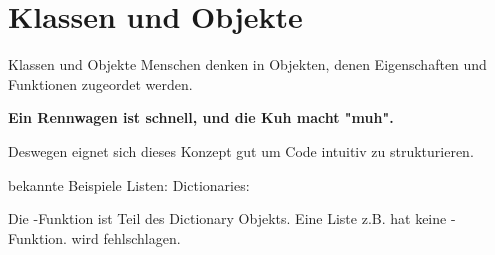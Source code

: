 \section{Klassen und Objekte}
\begin{frame}{Klassen und Objekte}
	Menschen denken in Objekten, denen Eigenschaften und Funktionen zugeordet werden. \linebreak
	\begin{center}
		 \textbf{Ein Rennwagen ist schnell, und die Kuh macht "muh".} \linebreak
	\end{center}
	Deswegen eignet sich dieses Konzept gut um Code intuitiv zu strukturieren.
\end{frame}
\begin{frame}{bekannte Beispiele}
	Listen: 
	\linebreak
	Dictionaries: 
	\linebreak
	
	Die -Funktion ist Teil des Dictionary Objekts. Eine Liste z.B. hat keine -Funktion. 
	\linebreak\linebreak
	 wird fehlschlagen.	
\end{frame}

